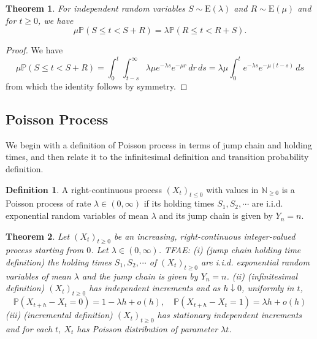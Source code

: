 \documentclass{article}
\newtheorem{Thm}{Theorem}[section]
\theoremstyle{definition}
\newtheorem{Def}{Definition}[section]
\newcommand{\PP}{\mathbb{P}}
\renewcommand{\leq}{\leqslant}
\renewcommand{\geq}{\geqslant}
\newcommand{\<}{\left\langle}
\renewcommand{\>}{\right\rangle}
\begin{document}
\begin{Thm}
    For independent random variables \(S \sim \text{E}(\lambda)\) and \(R \sim \text{E}(\mu)\) and for \(t \geq 0\), we have
\[
\mu \PP(S \leq t < S + R) = \lambda \PP(R \leq t < R + S).
\]
\end{Thm}
\begin{proof}
    We have
    \[
    \mu \PP(S \leq t < S + R) = \int_{0}^{t} \int_{t-s}^{\infty} \lambda\mu e^{-\lambda s} e^{-\mu r} \, dr \, ds = \lambda\mu \int_{0}^{t} e^{-\lambda s} e^{-\mu(t-s)} \, ds
    \]
    from which the identity follows by symmetry.
    
\end{proof}
\subsection{Poisson Process}

We begin with a definition of Poisson process in terms of jump chain and holding times, and then relate it to
the infinitesimal definition and transition probability definition.
\begin{Def}
    A right-continuous process $(X_t)_{t\leq 0}$ with values in $\mathbb{N}_{\geq 0}$ is a Poisson process of rate $\lambda\in (0,\infty)$
    if its holding times $S_1,S_2,\cdots$ are i.i.d. exponential random variables of mean $\lambda$ and its jump chain is given by $Y_n=n$.
\end{Def}

\begin{Thm}
    Let $(X_t)_{t\geq 0}$ be an increasing, right-continuous integer-valued process starting from $0$. Let $\lambda\in(0,\infty)$. TFAE:\newline 
    (i) (jump chain holding time definition) the holding times $S_1,S_2,\cdots$ of $(X_t)_{t\geq 0}$ are i.i.d. exponential random variables of mean $\lambda$ 
    and the jump chain is given by $Y_n=n$.\newline 
    (ii) (infinitesimal definition) $(X_t)_{t\geq 0}$ has independent increments and as $h\downarrow 0$, uniformly in $t$,
    \[\PP(X_{t+h}-X_t=0)=1-\lambda h+o(h),\quad \PP(X_{t+h}-X_t=1)=\lambda h+o(h)\]\newline 
    (iii) (incremental definition) $(X_t)_{t\geq 0}$ has stationary independent increments and for each $t$, $X_t$ has Poisson distribution of parameter $\lambda t$.
\end{Thm}
\end{document}
